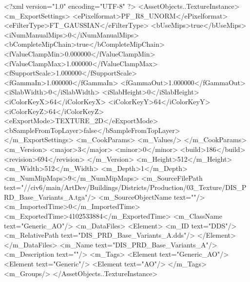 <?xml version="1.0" encoding="UTF-8" ?>
<AssetObjects..TextureInstance>
	<m_ExportSettings>
		<ePixelformat>PF_R8_UNORM</ePixelformat>
		<eFilterType>FT_GAUSSIAN</eFilterType>
		<bUseMips>true</bUseMips>
		<iNumManualMips>0</iNumManualMips>
		<bCompleteMipChain>true</bCompleteMipChain>
		<fValueClampMin>0.000000</fValueClampMin>
		<fValueClampMax>1.000000</fValueClampMax>
		<fSupportScale>1.000000</fSupportScale>
		<fGammaIn>1.000000</fGammaIn>
		<fGammaOut>1.000000</fGammaOut>
		<iSlabWidth>0</iSlabWidth>
		<iSlabHeight>0</iSlabHeight>
		<iColorKeyX>64</iColorKeyX>
		<iColorKeyY>64</iColorKeyY>
		<iColorKeyZ>64</iColorKeyZ>
		<eExportMode>TEXTURE_2D</eExportMode>
		<bSampleFromTopLayer>false</bSampleFromTopLayer>
	</m_ExportSettings>
	<m_CookParams>
		<m_Values/>
	</m_CookParams>
	<m_Version>
		<major>3</major>
		<minor>0</minor>
		<build>186</build>
		<revision>694</revision>
	</m_Version>
	<m_Height>512</m_Height>
	<m_Width>512</m_Width>
	<m_Depth>1</m_Depth>
	<m_NumMipMaps>9</m_NumMipMaps>
	<m_SourceFilePath text="//civ6/main/ArtDev/Buildings/Districts/Production/03_Texture/DIS_PRD_Base_Variants_A.tga"/>
	<m_SourceObjectName text=""/>
	<m_ImportedTime>0</m_ImportedTime>
	<m_ExportedTime>4102533884</m_ExportedTime>
	<m_ClassName text="Generic_AO"/>
	<m_DataFiles>
		<Element>
			<m_ID text="DDS"/>
			<m_RelativePath text="DIS_PRD_Base_Variants_A.dds"/>
		</Element>
	</m_DataFiles>
	<m_Name text="DIS_PRD_Base_Variants_A"/>
	<m_Description text=""/>
	<m_Tags>
		<Element text="Generic_AO"/>
		<Element text="Generic"/>
		<Element text="AO"/>
	</m_Tags>
	<m_Groups/>
</AssetObjects..TextureInstance>

